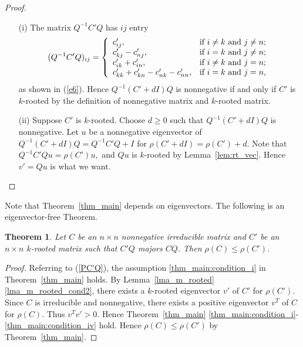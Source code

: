 \documentclass[12pt, a4paper]{article}
\theoremstyle{plain}
\newtheorem{thm}{Theorem}[section]
\theoremstyle{definition}
\begin{document}
\begin{proof}
\begin{enumerate}
  \item[(i)] The matrix $Q^{-1}C'Q$ has $ij$ entry
$$(Q^{-1}C'Q)_{ij}=\left\{
                     \begin{array}{ll}
                       c'_{ij}, & \hbox{if $i\not=k$ and $j\not=n$;} \\
                       c'_{kj}-c'_{nj}, & \hbox{if $i=k$ and $j\not=n$;} \\
                       c'_{ik}+c'_{in}, & \hbox{if $i\not=k$ and $j=n$;} \\ 
                       c'_{kk}+c'_{kn}-c'_{nk}-c'_{nn}, & \hbox{if $i=k$ and $j=n$},
                     \end{array}
                   \right.$$
as shown in (\ref{e6}). 
Hence $Q^{-1}(C'+dI)Q$ is nonnegative if and only if $C'$ is $k$-rooted by the definition of nonnegative matrix and $k$-rooted matrix.
  \item[(ii)] Suppose $C'$ is $k$-rooted. Choose $d\geq 0$ such that $Q^{-1}(C'+dI)Q$ is nonnegative.  
Let $u$ be a nonnegative eigenvector of $Q^{-1}(C'+dI)Q=Q^{-1}C'Q+I$ for $\rho(C'+dI)=\rho(C')+d.$
Note that $Q^{-1}C'Qu=\rho(C')u,$ and $Qu$ is $k$-rooted by Lemma~\ref{lem:rt_vec}. Hence $v'=Qu$ is what we want. 
\end{enumerate}
\end{proof}




Note that Theorem~\ref{thm_main} depends on eigenvectors. The following is an eigenvector-free Theorem. 


\begin{thm}\label{thm:conclusion}
    Let $C$ be an $n\times n$ nonnegative irreducible matrix and $C'$ be an $n\times n$ $k$-rooted matrix such that $C'Q$ majors $CQ$. 
 Then $\rho(C)\leq \rho(C')$. 
\end{thm}

\begin{proof} Referring to (\ref{PC'Q}), the assumption \ref{thm_main:condition_i} in  Theorem~\ref{thm_main} holds. 
By Lemma~\ref{lma_m_rooted} \ref{lma_m_rooted_cond2}, there exists a  $k$-rooted eigenvector $v'$ of $C'$  for $\rho(C')$. 
Since $C$ is irreducible and nonnegative, there exists a positive eigenvector $v^T$ of $C$ for $\rho(C).$ 
Thus $v^Tv'>0$. Hence Theorem~\ref{thm_main} \ref{thm_main:condition_i}-\ref{thm_main:condition_iv} hold.
Hence  $\rho(C) \leq \rho(C')$ by   Theorem~\ref{thm_main}.
\end{proof}
\end{document}
